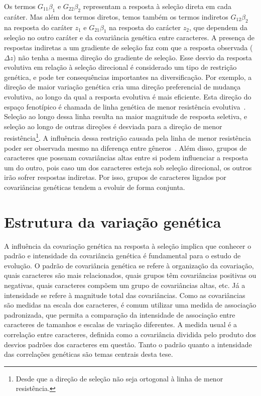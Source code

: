 \begin{refsection}
Os termos $G_{11}\beta_{1}$ e $G_{22}\beta_{2}$ representam a resposta à
seleção direta em cada caráter. Mas além dos termos diretos, temos também  os
termos indiretos $G_{12}\beta_{2}$ na resposta do caráter $z_1$ e
$G_{21}\beta_{1}$ na resposta do carácter $z_2$, que dependem da seleção no
outro caráter e da covariância genética entre caracteres. A presença de
respostas indiretas a um gradiente de seleção faz com que a resposta observada
($\Delta z$) não tenha a mesma direção do gradiente de seleção. Esse desvio da
resposta evolutiva em relação à seleção direcional é considerado um tipo de
restrição genética, e pode ter consequências importantes na diversificação.
Por exemplo, a direção de maior variação genética cria uma direção
preferencial de mudança evolutiva, ao longo da qual a resposta evolutiva é
mais eficiente. Esta direção do espaço fenotípico é chamada de linha genética
de menor resistência evolutiva~\parencite{Schluter1996-gw}. Seleção ao longo
dessa linha resulta na maior magnitude de resposta seletiva, e seleção ao
longo de outras direções é desviada para a direção de menor
resistência\footnote{Desde que a direção de seleção não seja ortogonal à linha
de menor resistência.}. A influência dessa restrição causada pela linha de
menor resistência poder ser observada mesmo na diferença entre
gêneros~\parencite{Marroig2005-ce}. Além disso, grupos de caracteres que
possuam covariâncias altas entre si podem influenciar a resposta um do outro,
pois caso um dos caracteres esteja sob seleção direcional, os outros
irão sofrer respostas indiretas. Por isso, grupos de caracteres ligados por
covariâncias genéticas tendem a evoluir de forma conjunta.

\section{Estrutura da variação genética}

A influência da covariação genética na resposta à seleção implica que conhecer
o padrão e intensidade da covariância genética é fundamental para o estudo de
evolução. O padrão de covariância genética se refere à organização da
covariação, quais caracteres são mais relacionados, quais grupos têm
covariâncias positivas ou negativas, quais caracteres compõem um grupo de
covariâncias altas, etc. Já a intensidade se refere à magnitude total das
covariâncias. Como as covariâncias são medidas na escala dos caracteres, é
comum utilizar uma medida de associação padronizada, que permita a comparação
da intensidade de associação entre caracteres de tamanhos e escalas de
variação diferentes. A medida usual é a correlação entre caracteres, definida
como a covariância dividida pelo produto dos desvios padrões dos caracteres em
questão. Tanto o padrão quanto a intensidade das correlações genéticas são temas
centrais desta tese.


\end{refsection}

